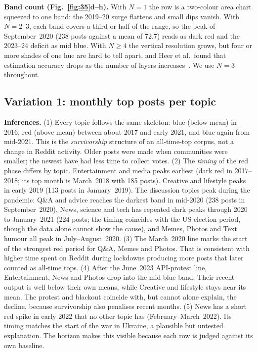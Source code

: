 \textbf{Band count (Fig.~\ref{fig:35}d--h).} With $N=1$ the row is a two-colour area chart squeezed to one band: the
2019--20 surge flattens and small dips vanish. With $N=2$--3, each band covers a third or half of the range, so the
peak of September~2020 (238 posts against a mean of 72.7) reads as dark red and the 2023--24 deficit as mid blue. With
$N\ge4$ the vertical resolution grows, but four or more shades of one hue are hard to tell apart, and Heer et al.\ found that
estimation accuracy drops as the number of layers increases~\cite{heer2009}. We use $N=3$ throughout.

\subsection{Variation 1: monthly top posts per topic}

\textbf{Inferences.}
(1) Every topic follows the same skeleton: blue (below mean) in 2016, red (above mean) between about 2017 and early 2021, and
blue again from mid-2021. This is the \emph{survivorship} structure of an all-time-top corpus, not a change in Reddit
activity. Older posts were made when communities were smaller; the newest have had less time to collect votes.
(2) The \emph{timing} of the red phase differs by topic. Entertainment and media peaks earliest (dark red in
2017--2018; its top month is March~2018 with 185 posts). Creative and lifestyle peaks in early 2019 (113 posts in
January~2019). The discussion topics peak during the pandemic: Q\&A and advice reaches the darkest band in mid-2020 (238
posts in September~2020), News, science and tech has repeated dark peaks through 2020 to January~2021 (224 posts; the timing coincides
with the US election period, though the data alone cannot show the cause), and Memes, Photos and Text humour all peak in
July--August~2020.
(3) The March~2020 line marks the start of the strongest red period for Q\&A, Memes and Photos. That is consistent with
higher time spent on Reddit during lockdowns producing more posts that later counted as all-time tops.
(4) After the June~2023 API-protest line, Entertainment, News and Photos drop into the mid-blue band. Their recent output is
well below their own means, while Creative and lifestyle stays near its mean. The protest and blackout coincide with, but
cannot alone explain, the decline, because survivorship also penalises recent months.
(5) News has a short red spike in early 2022 that no other topic has (February--March~2022). Its timing matches the start of
the war in Ukraine, a plausible but untested explanation.
The horizon makes this visible because each row is judged against its own baseline.


